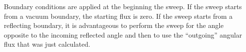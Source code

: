 \documentclass[]{SRJcommon}
\begin{document}
Boundary conditions are applied at the beginning the sweep. If the sweep starts
from a vacuum boundary, the starting flux is zero. If the sweep starts from a
reflecting boundary, it is advantageous to perform the sweep for the
angle opposite to the incoming reflected angle and then to use the ``outgoing''
angular flux that was just calculated.
\nocite{Lew1984}\nocite{Lar2007}


\end{document}
